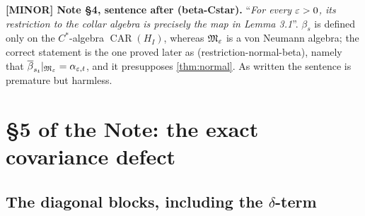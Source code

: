 \documentclass[11pt]{article}
\newcommand{\CAR}{\operatorname{CAR}}
\begin{document}
\begin{verdictgap}
\textbf{[MINOR] Note \S4, sentence after (beta-Cstar).} ``\emph{For every
$\varepsilon>0$, its restriction to the collar algebra is precisely the map in Lemma
3.1}''. $\beta_s$ is defined only on the $C^*$-algebra $\CAR(H_I)$, whereas
$\mathfrak M_\varepsilon$ is a von Neumann algebra; the correct statement is the one proved
later as (restriction-normal-beta), namely that
$\overline\beta_{s_t}|_{\mathfrak M_\varepsilon}=\alpha_{\varepsilon,t}$, and it presupposes
\cref{thm:normal}. As written the sentence is premature but harmless.
\end{verdictgap}

\section{\S5 of the Note: the exact covariance defect}\label{sec:five}

\subsection{The diagonal blocks, including the \texorpdfstring{$\delta$}{delta}-term}
\end{document}
